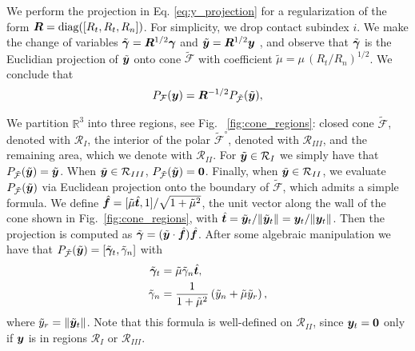 We perform the projection in Eq. \eqref{eq:y_projection} for a regularization of
the form ${\bm{R}} = \text{diag}([R_t, R_t, R_n])$. For simplicity, we drop
contact subindex $i$. We make the change of variables
$\tilde{{\bm\gamma}}={\bm{R}}^{1/2}{\bm\gamma}$ and $\tilde{{\bm{y}}}={\bm{R}}^{1/2}{\bm{y}}$
\cite{bib:todorov2014}, and observe that $\tilde{{\bm\gamma}}$ is the Euclidian
projection of $\tilde{{\bm{y}}}$ onto cone $\tilde{\mathcal{F}}$ with coefficient
$\tilde \mu =\mu\,(R_t/R_n)^{1/2}$. We conclude that
\begin{eqnarray*}
  P_\mathcal{F}({\bm{y}})={\bm{R}}^{-1/2} P_{\tilde{\mathcal{F}}}(\tilde{{\bm{y}}}),
\end{eqnarray*}

We partition $\mathbb{R}^3$ into three regions, see Fig.~
\ref{fig:cone_regions}: closed cone $\tilde{\mathcal{F}}$, denoted with
$\mathcal{R}_I$, the interior of the polar $\tilde{\mathcal{F}}^\circ$, denoted
with $\mathcal{R}_{III}$, and the remaining area, which we denote with
$\mathcal{R}_{II}$. For $\tilde{{\bm{y}}}\in\mathcal{R}_I$ we simply have that
$P_{\tilde{\mathcal{F}}}(\tilde{{\bm{y}}}) = \tilde{{\bm{y}}}$. When
$\tilde{{\bm{y}}}\in\mathcal{R}_{III}$, $P_{\tilde{\mathcal{F}}}(\tilde{{\bm{y}}}) =
{\bm{0}}$. Finally, when $\tilde{{\bm{y}}}\in\mathcal{R}_{II}$, we evaluate
$P_{\tilde{\mathcal{F}}}(\tilde{{\bm{y}}})$ via Euclidean projection onto the
boundary of $\tilde{\mathcal{F}}$, which admits a simple formula. We define
$\hat{{\bm{f}}}=[\tilde{\mu}\hat{{\bm{t}}}, 1]/\sqrt{1+\tilde{\mu}^2}$, the unit
vector along the wall of the cone shown in Fig.~\ref{fig:cone_regions}, with
$\hat{{\bm{t}}}=\tilde{{\bm{y}}}_t/\Vert\tilde{{\bm{y}}}_t\Vert={\bm{y}}_t/\Vert{\bm{y}}_t\Vert$.
Then the projection is computed as
$\tilde{{\bm\gamma}}=(\tilde{{\bm{y}}}\cdot\hat{{\bm{f}}})\hat{{\bm{f}}}$. After some
algebraic manipulation we have that $P_{\tilde{\mathcal{F}}}(\tilde{{\bm{y}}}) =
[\tilde{{\bm\gamma}}_t, \tilde{\gamma}_n]$ with
\begin{align*}
  \tilde{{\bm\gamma}}_t       &= \tilde{\mu}\tilde{\gamma}_n\hat{{\bm{t}}},\\
        \tilde{\gamma}_n  &= \frac{1}{1+\tilde{\mu}^2}\left(\tilde{y}_n +
	\tilde{\mu}\tilde{y}_r\right),
\end{align*}
where $\tilde{y}_r=\Vert\tilde{{\bm{y}}}_t\Vert$. Note that this formula is
well-defined on $\mathcal{R}_{II}$, since ${\bm{y}}_t = {\bm{0}}$ only if ${\bm{y}}$ is in regions $\mathcal{R}_{I}$ or $\mathcal{R}_{III}$.
